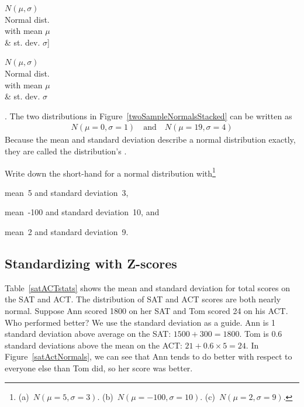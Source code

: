 $N(\mu, \sigma)$\vspace{1mm}\\\footnotesize Normal dist.\\with mean $\mu$\\\& st. dev. $\sigma$]{\raggedright\vspace{-5mm}

$N(\mu, \sigma)$\vspace{1mm}\\\footnotesize Normal dist.\\with mean $\mu$\\\& st. dev. $\sigma$}. The two distributions in Figure~\ref{twoSampleNormalsStacked} can be written as
\begin{align*}
N(\mu=0,\sigma=1)\quad\text{and}\quad N(\mu=19,\sigma=4)
\end{align*}
Because the mean and standard deviation describe a normal distribution exactly, they are called the distribution's .

\begin{exercise}
Write down the short-hand for a normal distribution with\footnote{(a)~$N(\mu=5,\sigma=3)$. (b)~$N(\mu=-100, \sigma=10)$. (c)~$N(\mu=2, \sigma=9)$.}
\begin{parts}
\item mean~5 and standard deviation~3,
\item mean~-100 and standard deviation~10, and
\item mean~2 and standard deviation~9.
\end{parts}
\end{exercise}

\subsection{Standardizing with Z-scores}

\begin{example}{Table~\vref{satACTstats} shows the mean and standard deviation for total scores on the SAT and ACT. The distribution of SAT and ACT scores are both nearly normal. Suppose Ann scored 1800 on her SAT and Tom scored 24 on his ACT. Who performed better?}\label{actSAT}
We use the standard deviation as a guide. Ann is 1 standard deviation above average on the SAT: $1500 + 300=1800$. Tom is 0.6 standard deviations above the mean on the ACT: $21+0.6\times 5=24$. In Figure~\ref{satActNormals}, we can see that Ann tends to do better with respect to everyone else than Tom did, so her score was better.
\end{example}

